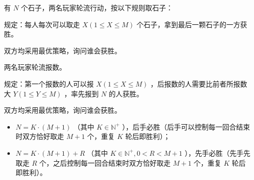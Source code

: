 有 $N$ 个石子，两名玩家轮流行动，按以下规则取石子：

规定：每人每次可以取走 $X(1 \le X \le M)$ 个石子，拿到最后一颗石子的一方获胜。

双方均采用最优策略，询问谁会获胜。

两名玩家轮流报数。

规定：第一个报数的人可以报 $X(1 \le X \le M)$ ，后报数的人需要比前者所报数大 $Y(1 \le Y \le M)$ ，率先报到 $N$ 的人获胜。

双方均采用最优策略，询问谁会获胜。

\begin{itemize}
    \item $N=K\cdot(M+1)$ （其中 $K \in \mathbb{N}^+$ ），后手必胜（后手可以控制每一回合结束时双方恰好取走 $M+1$ 个，重复 $K$ 轮后即胜利）；
    \item $N=K\cdot(M+1)+R$ （其中 $K \in \mathbb{N}^+,0 < R < M + 1$ ），先手必胜（先手先取走 $R$ 个，之后控制每一回合结束时双方恰好取走 $M+1$ 个，重复 $K$ 轮后即胜利）。
\end{itemize}